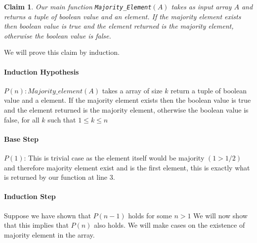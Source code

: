 \documentclass[answers]{exam}
\newtheorem{claim}{Claim}
\begin{document}
\begin{questions}
\begin{parts}
\begin{solution}
\begin{claim} Our main function \texttt{Majority\_Element}$(A)$ takes as input array $A$ and  returns a tuple of boolean value and an element. If the majority element exists then boolean value is true and the element returned is the majority element, otherwise the boolean value is false.
\end{claim}

We will prove this claim by induction.
\paragraph{Induction Hypothesis} $P(n): Majority\_element(A)$ takes a array of size $k$ return a tuple of boolean value and a element. If the majority element exists then the boolean value is true and the element returned is the majority element, otherwise the boolean value is false, for all $k$ such that $1\leq k \leq n$

\paragraph{Base Step} $P(1)$: This is trivial case as the element itself would be majority $(1>1/2)$ and therefore majority element exist and is the first element, this is exactly what is returned by our function at line 3.

\paragraph{Induction Step} Suppose  we  have  shown  that $P(n-1)$  holds  for  some $n >1$   We  will  now show that this implies that $P(n)$ also holds. We will make cases on the existence of majority element in the array. 


\end{solution}
\end{parts}
\end{questions}
\end{document}
